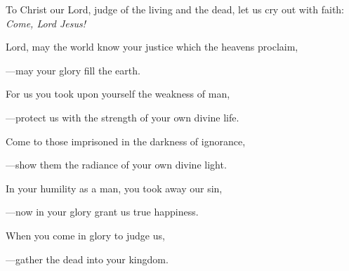 \intercessions\indent

\begin{hangpar}

To Christ our Lord, judge of the living and the dead, let us cry out with faith:\\
\emph{Come, Lord Jesus!}

\medskip Lord, may the world know your justice which the heavens proclaim,

{\color{red}---\thinspace}may your glory fill the earth.

\medskip For us you took upon yourself the weakness of man,

{\color{red}---\thinspace}protect us with the strength of your own divine life.

\medskip Come to those imprisoned in the darkness of ignorance,

{\color{red}---\thinspace}show them the radiance of your own divine light.

\medskip In your humility as a man, you took away our sin,

{\color{red}---\thinspace}now in your glory grant us true happiness.

\medskip When you come in glory to judge us,

{\color{red}---\thinspace}gather the dead into your kingdom.

\end{hangpar}